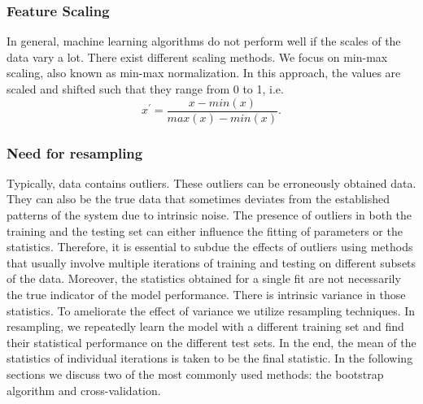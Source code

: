 \subsubsection{Feature Scaling}\label{subsubsec:scaling}
In general, machine learning algorithms do not perform well if the scales of the data vary a lot. There exist different scaling methods. We focus on min-max scaling, also known as min-max normalization. In this approach, the values are scaled and shifted such that they range from 0 to 1, i.e. 
\begin{equation*}
    x^{'} = \frac{x - min(x)}{max(x) - min(x)}.
\end{equation*}

\subsubsection{Need for resampling}
Typically, data contains outliers. These outliers can be erroneously obtained data. They can also be the true data that sometimes deviates from the established patterns of the system due to intrinsic noise. The presence of outliers in both the training and the testing set can either influence the fitting of parameters or the statistics. Therefore, it is essential to subdue the effects of outliers using methods that usually involve multiple iterations of training and testing on different subsets of the data. Moreover, the statistics obtained for a single fit are not necessarily the true indicator of the model performance. There is intrinsic variance in those statistics. To ameliorate the effect of variance we utilize resampling techniques. In resampling, we repeatedly learn the model with a different training set and find their statistical performance on the different test sets. In the end, the mean of the statistics of individual iterations is taken to be the final statistic. \newline \newline In the following sections we discuss two of the most commonly used methods: the bootstrap algorithm and cross-validation. 
